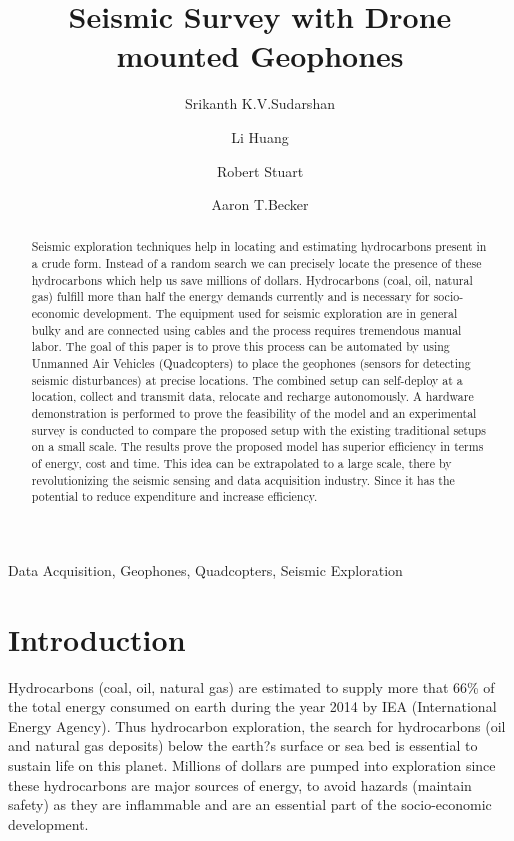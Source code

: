 \documentclass[conference]{IEEEtran}
\begin{document}
%
\title{Seismic Survey with Drone mounted Geophones } 

\author[1]{\rm Srikanth K.V.Sudarshan}
\author[1]{\rm Li Huang}
\author[2]{\rm Robert Stuart}
\author[1]{\rm Aaron T.Becker}
\maketitle

\begin{abstract}
Seismic exploration techniques help in locating and estimating hydrocarbons present in a crude form. Instead of a random search we can precisely locate the presence of these hydrocarbons which help us save millions of dollars. Hydrocarbons (coal, oil, natural gas) fulfill more than half the energy demands currently and is necessary for socio-economic development. The equipment used for seismic exploration are in general bulky and are connected using cables and the process requires tremendous manual labor. The goal of this paper is to prove this process can be automated by using Unmanned Air Vehicles (Quadcopters) to place the geophones (sensors for detecting seismic disturbances) at precise locations. The combined setup can self-deploy at a location, collect and transmit data, relocate and recharge autonomously. A hardware demonstration is performed to prove the feasibility of the model and an experimental survey is conducted to compare the proposed setup with the existing traditional setups on a small scale. The results prove the proposed model has superior efficiency in terms of energy, cost and time. This idea can be extrapolated to a large scale, there by revolutionizing the seismic sensing and data acquisition industry. Since it has the potential to reduce expenditure and increase efficiency.  
 
\end{abstract}
\begin{IEEEkeywords} Data Acquisition, Geophones, Quadcopters, Seismic Exploration \end{IEEEkeywords}




\section{Introduction}
Hydrocarbons (coal, oil, natural gas) are estimated to supply more that 66\% of the total energy consumed on earth during the year 2014 by IEA (International Energy Agency).  Thus hydrocarbon exploration, the search for hydrocarbons (oil and natural gas deposits) below the earth?s surface or sea bed is essential to sustain life on this planet. Millions of dollars are pumped into exploration since these hydrocarbons are major sources of energy, to avoid hazards (maintain safety) as they are inflammable and are an essential part of the socio-economic development.
 
\end{document}
